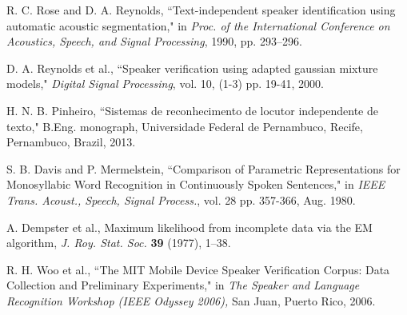 \documentclass[a4paper,twocolumn]{article}
\begin{document}
\begin{thebibliography}{9}
        R. C. Rose and D. A. Reynolds,
        ``Text-independent speaker identification using automatic acoustic segmentation,"
        in \textit{Proc. of the International Conference on Acoustics, Speech, and
        Signal Processing},
        1990,
        pp. 293–296.

        D. A. Reynolds et al.,
        ``Speaker verification using adapted gaussian mixture models,"
        \textit{Digital Signal Processing}, vol. 10,
        (1-3) pp. 19-41,
        2000.

        H. N. B. Pinheiro,
        ``Sistemas de reconhecimento de locutor independente de texto,"
        B.Eng. monograph, Universidade Federal de Pernambuco,
        Recife, Pernambuco, Brazil,
        2013.

        S. B. Davis and P. Mermelstein,
        ``Comparison of Parametric Representations for Monosyllabic Word Recognition in Continuously Spoken Sentences,"
        in \textit{IEEE Trans. Acoust., Speech, Signal Process.},
        vol. 28
        pp. 357-366,
        Aug. 1980.

        A. Dempster et al.,
        Maximum likelihood from incomplete data via the EM algorithm,
        \textit{J. Roy. Stat. Soc.} \textbf{39} (1977), 1–38.

        R. H. Woo et al.,
        ``The MIT Mobile Device Speaker Verification Corpus: Data Collection and Preliminary Experiments,"
        in \textit{The Speaker and Language Recognition Workshop (IEEE Odyssey 2006),}
        San Juan, Puerto Rico, 2006.

\end{thebibliography}
\end{document}
